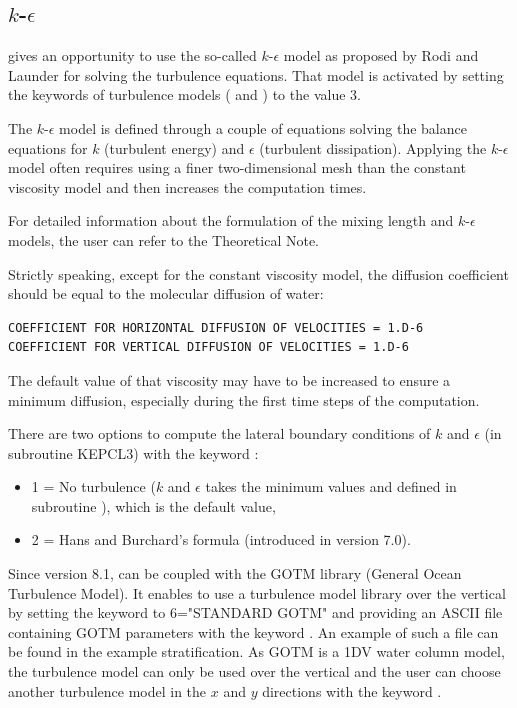 \subsection{$k$-$\epsilon$}

 gives an opportunity to use the so-called $k$-$\epsilon$
model as proposed by Rodi and Launder for solving the turbulence equations.
That model is activated by setting the keywords of turbulence models
( and )
to the value 3.

The $k$-$\epsilon$ model is defined through a couple of equations
solving the balance equations for $k$ (turbulent energy) and $\epsilon$
(turbulent dissipation). Applying the $k$-$\epsilon$ model often
requires using a finer two-dimensional mesh than the constant viscosity model
and then increases the computation times.

For detailed information about the formulation of the mixing length and
$k$-$\epsilon$ models, the user can refer to the  Theoretical
Note.

Strictly speaking, except for the constant viscosity model, the diffusion
coefficient should be equal to the molecular diffusion of water:

\begin{lstlisting}[language=TelemacCas]
COEFFICIENT FOR HORIZONTAL DIFFUSION OF VELOCITIES = 1.D-6
COEFFICIENT FOR VERTICAL DIFFUSION OF VELOCITIES = 1.D-6
\end{lstlisting}

The default value of that viscosity may have to be increased to ensure a minimum
diffusion, especially during the first time steps of the computation.

There are two options to compute the lateral boundary conditions of $k$ and
$\epsilon$ (in subroutine KEPCL3) with the keyword
:
\begin{itemize}
\item 1 = No turbulence ($k$ and $\epsilon$ takes the minimum values
 and  defined in subroutine ),
which is the default value,
\item 2 = Hans and Burchard’s formula (introduced in version 7.0).
\end{itemize}

Since version 8.1,  can be coupled with the GOTM library
(General Ocean Turbulence Model).
It enables to use a turbulence model library over the vertical by setting
the keyword  to 6="STANDARD GOTM"
and providing an ASCII file containing GOTM parameters with the keyword
.
An example of such a file can be found in the  example
stratification.
As GOTM is a 1DV water column model, the turbulence model can only be used over
the vertical and the user can choose another turbulence model in the $x$ and
$y$ directions with the keyword .

